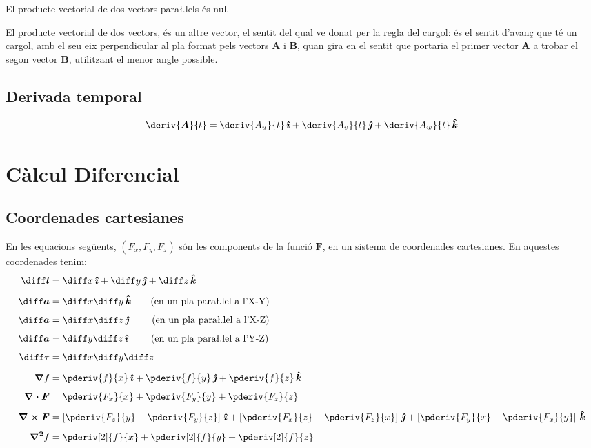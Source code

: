 \documentclass[catalan,a4paper,twoside,11pt]{article}
\begin{document}
El producte vectorial de dos vectors para{\l.l}els  \'{e}s nul.

El producte vectorial de dos vectors, \'{e}s un altre vector, el
sentit del qual ve donat per la regla del cargol: \'{e}s el sentit
d'avan\c{c} que t\'{e} un cargol, amb el seu eix perpendicular al
pla format pels vectors  $\boldsymbol{A}$ i $\boldsymbol{B}$, quan
gira en el sentit que portaria el primer vector  $\boldsymbol{A}$ a
trobar el segon vector $\boldsymbol{B}$, utilitzant el menor angle
possible.

\subsection{Derivada temporal}
\begin{equation}
    \deriv{\boldsymbol{A}}{t} = \deriv{A_u}{t}\va +
    \deriv{A_v}{t}\vb + \deriv{A_w}{t}\vc
\end{equation}


\section{C\`{a}lcul Diferencial }

\subsection{Coordenades cartesianes}
\renewcommand{\va}{\ensuremath{\,\boldsymbol{\hat{\imath}}}}
\renewcommand{\vb}{\ensuremath{\,\boldsymbol{\hat{\jmath}}}}
\renewcommand{\vc}{\ensuremath{\,\boldsymbol{\hat{k}}}}

En les equacions seg\"{u}ents, $(F_x,F_y,F_z)$  s\'{o}n les
components de la funci\'{o}  $\boldsymbol{F}$, en un sistema de
coordenades cartesianes. En aquestes coordenades tenim:
\begin{align}
    \boldsymbol{\diff l} &= \diff x \va + \diff y \vb + \diff z \vc\\[1ex]
    \boldsymbol{\diff a} &= \diff x \diff y \vc \qquad\text{(en un pla
    para{\l.l}el a l'X-Y)}\\[1ex]
    \boldsymbol{\diff a} &= \diff x \diff z \vb \qquad\text{ (en un pla
    para{\l.l}el a l'X-Z)}\\[1ex]
    \boldsymbol{\diff a} &= \diff y \diff z \va \qquad\text{ (en un pla
    para{\l.l}el a l'Y-Z)}\\[1ex]
    \diff\tau &= \diff x \diff y \diff z\\[1ex]
    \boldsymbol{\nabla}f &= \pderiv{f}{x}\va + \pderiv{f}{y}\vb
    + \pderiv{f}{z}\vc\\[1ex]
    \boldsymbol{\nabla\cdot F} &= \pderiv{F_x}{x} + \pderiv{F_y}{y}
    + \pderiv{F_z}{z}\\[1ex]
    \boldsymbol{\nabla\times F} &= \left[\pderiv{F_z}{y}-\pderiv{F_y}{z}\right]\va +
    \left[\pderiv{F_x}{z}-\pderiv{F_z}{x}\right]\vb +
    \left[\pderiv{F_y}{x}-\pderiv{F_x}{y}\right]\vc\\[1ex]
    \boldsymbol{\nabla^2}f &= \pderiv[2]{f}{x} + \pderiv[2]{f}{y}+ \pderiv[2]{f}{z}
\end{align}
\end{document}
